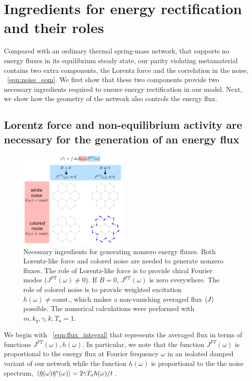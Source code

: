 \documentclass[
 preprint,
 preprintnumbers,
 amsmath,amssymb,
 aps,
 pre,
 longbibliography,
 superscriptaddress,
 10pt, twocolumn
]{revtex4-1}
\begin{document}
\section{Ingredients for energy rectification and their roles} \label{sec:fourier}

Compared with an ordinary thermal spring-mass network, that supports no energy fluxes in its equilibrium steady state, our parity violating metamaterial contains two extra components, the Lorentz force and the correlation in the noise, \eqnname~\ref{eqn:noise_eom}.
We first show that these two components provide two necessary ingredients required to ensure energy rectification in our model. Next, we show how the geometry of the network also controls the energy flux. 



\subsection{Lorentz force and non-equilibrium activity are necessary for the generation of an energy flux} 

\begin{figure}[ht]
	\centering
	\includegraphics[width=0.48\textwidth]{ingredients.pdf}
    \caption{
    Necessary ingredients for generating nonzero energy fluxes.
    Both Lorentz-like force and colored noise are needed to generate nonzero fluxes.
    The role of Lorentz-like force is to provide chiral Fourier modes ($J^{FT}(\omega)\neq 0$). If $B=0$, $J^{FT}(\omega)$ is zero everywhere. 
    The role of colored noise is to provide weighted excitation $h(\omega)\neq \text{const.}$, which makes a non-vanishing averaged flux $\expval{J}$ possible.
    The numerical calculations were performed with $m,k_g,\gamma,k, T_a=1$. 
    }
    \label{fig:ingredients}
\end{figure}
We begin with \eqnname~\eqref{eqn:flux_integral} that represents the averaged flux in terms of functions $J^{FT}(\omega), h(\omega)$. In particular, we note that the function $J^{FT}(\omega)$ is proportional to the energy flux at Fourier frequency $\omega$ in an isolated damped variant of our network while the function $h(\omega)$ is proportional to the the noise spectrum, $\expval{\tilde{\eta}(\omega)\tilde{\eta}^*(\omega)} = 2\gamma T_a h(\omega) / t$.
\end{document}

